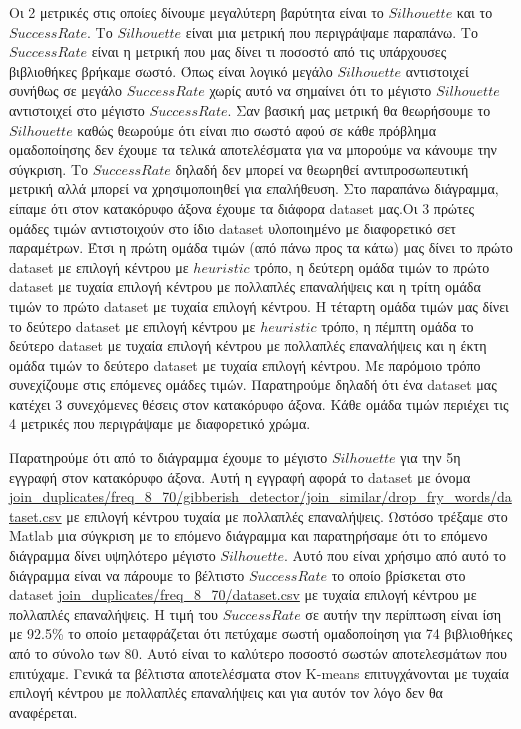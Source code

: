 Οι 2 μετρικές στις οποίες δίνουμε μεγαλύτερη βαρύτητα είναι το $Silhouette$ και το $Success Rate$. Το $Silhouette$ είναι μια μετρική που περιγράψαμε παραπάνω. Το $Success Rate$ είναι η μετρική που μας δίνει τι ποσοστό από τις υπάρχουσες βιβλιοθήκες βρήκαμε σωστό. Όπως είναι λογικό μεγάλο $Silhouette$ αντιστοιχεί συνήθως σε μεγάλο $Success Rate$ χωρίς αυτό να σημαίνει ότι το μέγιστο $Silhouette$ αντιστοιχεί στο μέγιστο $Success Rate$. Σαν βασική μας μετρική θα θεωρήσουμε το $Silhouette$ καθώς θεωρούμε ότι είναι πιο σωστό αφού σε κάθε πρόβλημα ομαδοποίησης δεν έχουμε τα τελικά αποτελέσματα για να μπορούμε να κάνουμε την σύγκριση. Το $Success Rate$ δηλαδή δεν μπορεί να θεωρηθεί αντιπροσωπευτική μετρική αλλά μπορεί να χρησιμοποιηθεί για επαλήθευση.
Στο παραπάνω διάγραμμα, είπαμε ότι στον κατακόρυφο άξονα έχουμε τα διάφορα dataset μας.Οι 3 πρώτες ομάδες τιμών αντιστοιχούν στο ίδιο dataset υλοποιημένο με διαφορετικό σετ παραμέτρων. Έτσι η πρώτη ομάδα τιμών (από πάνω προς τα κάτω) μας δίνει το πρώτο dataset με επιλογή κέντρου με $heuristic$ τρόπο, η δεύτερη ομάδα τιμών το πρώτο dataset με τυχαία επιλογή κέντρου με πολλαπλές επαναλήψεις και η τρίτη ομάδα τιμών το πρώτο dataset με τυχαία επιλογή κέντρου. Η τέταρτη ομάδα τιμών μας δίνει το δεύτερο dataset με επιλογή κέντρου με $heuristic$ τρόπο, η πέμπτη ομάδα το δεύτερο dataset  με τυχαία επιλογή κέντρου με πολλαπλές επαναλήψεις και η έκτη ομάδα τιμών το δεύτερο dataset με τυχαία επιλογή κέντρου. Με παρόμοιο τρόπο συνεχίζουμε στις επόμενες ομάδες τιμών. Παρατηρούμε δηλαδή ότι ένα dataset μας κατέχει 3 συνεχόμενες θέσεις στον κατακόρυφο άξονα.
Κάθε ομάδα τιμών περιέχει τις 4 μετρικές που περιγράψαμε με διαφορετικό χρώμα.

Παρατηρούμε ότι από το διάγραμμα έχουμε το μέγιστο $Silhouette$ για την 5η εγγραφή στον κατακόρυφο άξονα. Αυτή η εγγραφή αφορά το dataset με όνομα \url{join_duplicates/freq_8_70/gibberish_detector/join_similar/drop_fry_words/dataset.csv} με επιλογή κέντρου τυχαία με πολλαπλές επαναλήψεις. Ωστόσο τρέξαμε στο Matlab μια σύγκριση με το επόμενο διάγραμμα και παρατηρήσαμε ότι το επόμενο διάγραμμα δίνει υψηλότερο μέγιστο $Silhouette$. Αυτό που είναι χρήσιμο από αυτό το διάγραμμα είναι να πάρουμε το βέλτιστο $Success Rate$ το οποίο βρίσκεται στο dataset \url{join_duplicates/freq_8_70/dataset.csv} με τυχαία επιλογή κέντρου με πολλαπλές επαναλήψεις. Η τιμή του $Success Rate$ σε αυτήν την περίπτωση είναι ίση με 92.5\% το οποίο μεταφράζεται ότι πετύχαμε σωστή ομαδοποίηση για 74 βιβλιοθήκες από το σύνολο των 80. Αυτό είναι το καλύτερο ποσοστό σωστών αποτελεσμάτων που επιτύχαμε. Γενικά τα βέλτιστα αποτελέσματα στον K-means επιτυγχάνονται με τυχαία επιλογή κέντρου με πολλαπλές επαναλήψεις και για αυτόν τον λόγο δεν θα αναφέρεται.

